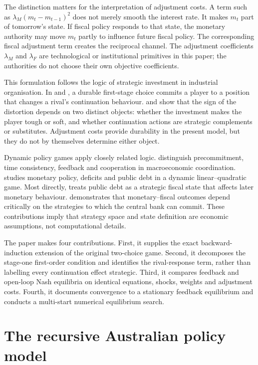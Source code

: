 \documentclass[11pt]{article}
\begin{document}
The distinction matters for the interpretation of adjustment costs.  A term
such as $\lambda_M(m_t-m_{t-1})^2$ does not merely smooth the interest rate.
It makes $m_t$ part of tomorrow's state.  If fiscal policy responds to that
state, the monetary authority may move $m_t$ partly to influence future fiscal
policy.  The corresponding fiscal adjustment term creates the reciprocal
channel.  The adjustment coefficients $\lambda_M$ and $\lambda_F$ are
technological or institutional primitives in this paper; the authorities do
not choose their own objective coefficients.

This formulation follows the logic of strategic investment in industrial
organisation.  In \citet{Dixit1980} and \citet{FudenbergTirole1983}, a durable
first-stage choice commits a player to a position that changes a rival's
continuation behaviour.  \citet{FudenbergTirole1984} and
\citet{BulowEtAl1985} show that the sign of the distortion depends on two
distinct objects: whether the investment makes the player tough or soft, and
whether continuation actions are strategic complements or substitutes.
Adjustment costs provide durability in the present model, but they do not by
themselves determine either object.

Dynamic policy games apply closely related logic.  \citet{OudizSachs1984}
distinguish precommitment, time consistency, feedback and cooperation in
macroeconomic coordination.  \citet{Tabellini1986} studies monetary policy,
deficits and public debt in a dynamic linear--quadratic game.  Most directly,
\citet{BeetsmaBovenberg1997} treats public debt as a strategic fiscal state
that affects later monetary behaviour.  \citet{Gnocchi2013} demonstrates that
monetary--fiscal outcomes depend critically on the strategies to which the
central bank can commit.  These contributions imply that strategy space and
state definition are economic assumptions, not computational details.

The paper makes four contributions.  First, it supplies the exact backward-
induction extension of the original two-choice game.  Second, it decomposes the
stage-one first-order condition and identifies the rival-response term, rather
than labelling every continuation effect strategic.  Third, it compares
feedback and open-loop Nash equilibria on identical equations, shocks, weights
and adjustment costs.  Fourth, it documents convergence to a stationary
feedback equilibrium and conducts a multi-start numerical equilibrium search.

\section{The recursive Australian policy model}
\end{document}
